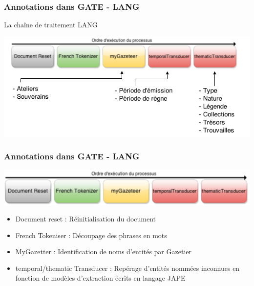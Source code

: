 \documentclass[10pt, compress]{beamer}
\begin{document}
\begin{frame}[fragile]
\frametitle{Annotations dans GATE - LANG}
La chaîne de traitement LANG
\begin{center}
\includegraphics[scale=0.5]{img/chaine1.png} 
\end{center}
\end{frame}

\begin{frame}[fragile]
\frametitle{Annotations dans GATE - LANG}
\begin{center}
\includegraphics[scale=0.5]{img/chaine2.png} 
\end{center}
\begin{itemize}[<+->]
	[square]
	\item{Document reset : Réinitialisation du document}
	\item{French Tokeniser : Découpage des phrases en mots}
	\item{MyGazetter : Identification de noms d'entités par Gazetier}
	\item{temporal/thematic Transducer : Repérage d'entités nommées inconnues en fonction de modèles d'extraction écrits en langage JAPE}
\end{itemize}
\end{frame}
\end{document}
